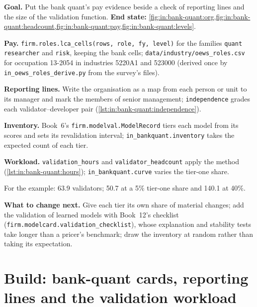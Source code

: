 \begin{tutorial}
\textbf{Goal.} Put the bank quant's pay evidence beside a check of reporting lines and the size of the validation
function. \textbf{End state:} \cref{fig:in:bank-quant:org,fig:in:bank-quant:headcount,fig:in:bank-quant:pay,fig:in:bank-quant:levels}.
\begin{tutsteps}
\item \textbf{Pay.} \texttt{firm.roles.lca\_cells(rows, role, fy, level)} for the families \texttt{quant researcher} and
\texttt{risk}, keeping the bank cells; \texttt{data/industry/oews\_roles.csv} for occupation 13-2054 in industries
5220A1 and 523000 (derived once by \texttt{in\_oews\_roles\_derive.py} from the survey's files).
\item \textbf{Reporting lines.} Write the organisation as a map from each person or unit to its manager and mark the
members of senior management; \texttt{independence} grades each validator--developer pair
(\cref{lst:in:bank-quant:independence}).
\label{lst:in:bank-quant:independence}
\item \textbf{Inventory.} Book~6's \texttt{firm.modelval.ModelRecord} tiers each model from its scores and sets its
revalidation interval; \texttt{in\_bankquant.inventory} takes the expected count of each tier.
\item \textbf{Workload.} \texttt{validation\_hours} and \texttt{validator\_headcount} apply the method
(\cref{lst:in:bank-quant:hours}); \texttt{in\_bankquant.curve} varies the tier-one share.
\label{lst:in:bank-quant:hours}
\end{tutsteps}
\end{tutorial}

For the example: 63.9 validators; 50.7 at a 5\% tier-one share and 140.1 at 40\%.

\textbf{What to change next.} Give each tier its own share of material changes; add the validation of learned models with
Book~12's checklist (\texttt{firm.modelcard.validation\_checklist}), whose explanation and stability tests take longer
than a pricer's benchmark; draw the inventory at random rather than taking its expectation.

\section{Build: bank-quant cards, reporting lines and the validation workload}\label{bld:in:bank-quant:roles}

